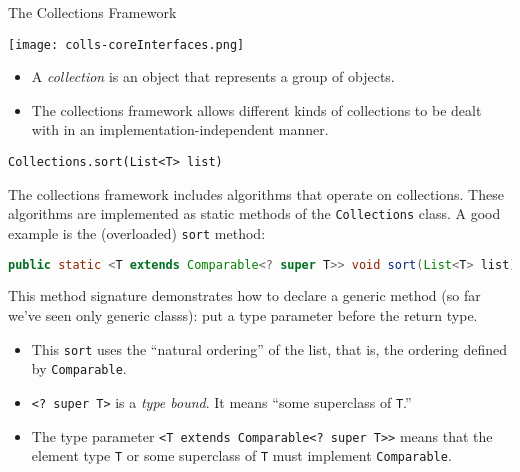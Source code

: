 \documentclass{beamer}
\begin{document}
\begin{frame}
  \titlepage
\end{frame}


\begin{frame}[fragile]{The Collections Framework}

\begin{center}
\texttt{[image: colls-coreInterfaces.png]}
\end{center}

\begin{itemize}
\item A {\it collection} is an object that represents a group of objects.
\item The collections framework allows different kinds of collections to be dealt with in an implementation-independent manner.
\end{itemize}


\end{frame}

\begin{frame}[fragile]{{\tt Collections.sort(List<T> list)}}


The collections framework includes algorithms that operate on collections.  These algorithms are implemented as static methods of the {\tt Collections} class.  A good example is the (overloaded) {\tt sort} method:
\begin{lstlisting}[language=Java]
public static <T extends Comparable<? super T>> void sort(List<T> list)
\end{lstlisting}
This method signature demonstrates how to declare a generic method (so far we've seen only generic classs): put a type parameter before the return type.
\begin{itemize}
\item This {\tt sort} uses the ``natural ordering'' of the list, that is, the ordering defined by {\tt Comparable}.
\item {\tt <? super T>} is a {\it type bound}.  It means ``some superclass of {\tt T}.''
\item The type parameter {\tt <T extends Comparable<? super T>>} means that the element type {\tt T} or some superclass of {\tt T} must implement {\tt Comparable}.
\end{itemize}


\end{frame}
\end{document}
